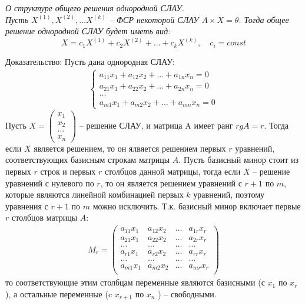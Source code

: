 \begin{answer}
  \textit{О структуре общего решения однородной СЛАУ. \\
  Пусть $X^{(1)}, X^{(2)}, \ldots X^{(k)}$ -- ФСР некоторой СЛАУ $A \times X = \theta$. Тогда общее решение однородной СЛАУ будет иметь вид: \[
    X = c_1 X^{(1)} + c_2 X^{(2)} + \ldots + c_k X^{(k)}, \quad c_i = const
\]}

Доказательство:
  Пусть дана однородная СЛАУ:
  \begin{align*}
    \begin{cases}
      a_{11} x_1 + a_{12} x_2 + \ldots + a_{1n} x_{n} = 0 \\
      a_{21} x_1 + a_{22} x_2 + \ldots + a_{2n} x_{n} = 0 \\
      \ldots \\
      a_{m1} x_1 + a_{m2} x_2 + \ldots + a_{mn} x_{n} = 0
    \end{cases} \tag{1}
  \end{align*}
  Пусть $X = \left( \begin{matrix} x_1 \\ x_2 \\ \ldots \\ x_{n} \end{matrix} \right) $ -- решение СЛАУ, и матрица A имеет ранг $rg A = r$. 
  Тогда если $X$ является решением, то он ялвяется решением первых $r$ уравнений, соответствующих базисным строкам матрицы $A$.
  Пусть базисный минор стоит из первых $r$ строк и первых $r$ столбцов данной матрицы, тогда если $X$ -- решение уравнений с нулевого по $r$, то он является решением уравнений с  $r+1$ по $m$, которые являются линейной комбинацией первых  $k$ уравнений, поэтому уравнения с  $r+1$ по $m$ можно исключить.
  Т.к. базисный минор включает первые $r$ столбцов матрицы  $A$:
  \begin{gather*}
    M_r =
    \begin{pmatrix}
      a_{11} x_1 & a_{12} x_2 & \ldots & a_{1r} x_r \\
      a_{21} x_1 & a_{22} x_2 & \ldots & a_{2r} x_r \\
      \ldots & \ldots & \ldots & \ldots \\
      a_{r1} x_1 & a_{r2} x_2 & \ldots & a_{rr} x_r \\
      \ldots & \ldots & \ldots & \ldots \\
      a_{m1} x_1 & a_{m2} x_2 & \ldots & a_{mr} x_r \\
    \end{pmatrix}
  \end{gather*}
  то соответствующие этим столбцам переменные являются базисными (с $x_1$ по $x_{r}$), а остальные переменные (c $x_{r+1}$ по $ x_n$ ) -- свободными.


\end{answer}

